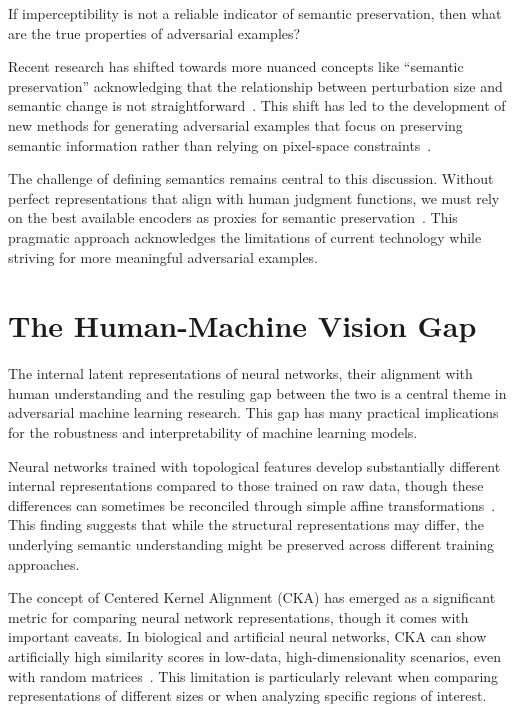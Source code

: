 \documentclass[a4paper, oneside]{discothesis}
\begin{document}
If imperceptibility is not a reliable indicator of semantic preservation, then what are the true properties of adversarial examples?

Recent research has shifted towards more nuanced concepts like ``semantic preservation'' acknowledging that the relationship between perturbation size and semantic change is not straightforward~\cite{careil2023towards}. This shift has led to the development of new methods for generating adversarial examples that focus on preserving semantic information rather than relying on pixel-space constraints~\cite{lee2020semantics}.

The challenge of defining semantics remains central to this discussion. Without perfect representations that align with human judgment functions, we must rely on the best available encoders as proxies for semantic preservation~\cite{herel2023preserving}. This pragmatic approach acknowledges the limitations of current technology while striving for more meaningful adversarial examples.

\section{The Human-Machine Vision Gap}

The internal latent representations of neural networks, their alignment with human understanding and the resuling gap between the two is a central theme in adversarial machine learning research. This gap has many practical implications for the robustness and interpretability of machine learning models.

Neural networks trained with topological features develop substantially different internal representations compared to those trained on raw data, though these differences can sometimes be reconciled through simple affine transformations~\cite{mcguire2023neural}. This finding suggests that while the structural representations may differ, the underlying semantic understanding might be preserved across different training approaches.

The concept of Centered Kernel Alignment (CKA) has emerged as a significant metric for comparing neural network representations, though it comes with important caveats. In biological and artificial neural networks, CKA can show artificially high similarity scores in low-data, high-dimensionality scenarios, even with random matrices~\cite{murphy2024correcting}. This limitation is particularly relevant when comparing representations of different sizes or when analyzing specific regions of interest.
\end{document}
